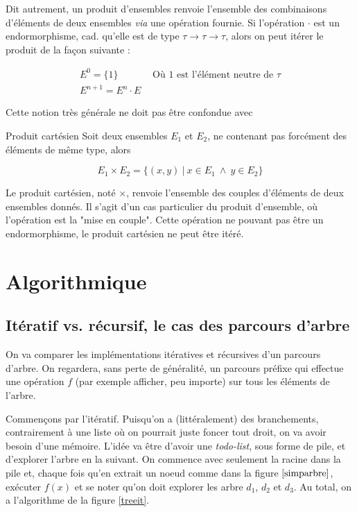 Dit autrement, un produit d'ensembles renvoie l'ensemble des combinaisons d'éléments de deux ensembles \textit{via} une opération fournie. Si l'opération $\cdot$ est un endormorphisme, cad. qu'elle est de type $\tau \rightarrow \tau \rightarrow \tau$, alors on peut itérer le produit de la façon suivante :

\begin{eqnarray*}
E^0 = \{1\} ~~~~~~~~~~~~~~~~ \textrm{Où $1$ est l'élément neutre de $\tau$} \\
E^{n+1} = E^n \cdot E
\end{eqnarray*}

Cette notion très générale ne doit pas être confondue avec

\begin{definition}{Produit cartésien}{}
Soit deux ensembles $E_1$ et $E_2$, ne contenant pas forcément des éléments de même type, alors

\[
E_1 \times E_2 = \{(x,y)~|~x \in E_1~\wedge~y \in E_2\}
\]
\end{definition}

Le produit cartésien, noté $\times$, renvoie l'ensemble des couples d'éléments de deux ensembles donnés. Il s'agit d'un cas particulier du produit d'ensemble, où l'opération est la "mise en couple". Cette opération ne pouvant pas être un endormorphisme, le produit cartésien ne peut être itéré.

\section{Algorithmique}

\subsection{Itératif vs. récursif, le cas des parcours d'arbre}
\label{itersif}
On va comparer les implémentations itératives et récursives d'un parcours d'arbre. On regardera, sans perte de généralité, un parcours préfixe qui effectue une opération $f$ (par exemple afficher, peu importe) sur tous les éléments de l'arbre.

Commençons par l'itératif. Puisqu'on a (littéralement) des branchements, contrairement à une liste où on pourrait juste foncer tout droit, on va avoir besoin d'une mémoire. L'idée va être d'avoir une \textit{todo-list}, sous forme de pile, et d'explorer l'arbre en la suivant. On commence avec seulement la racine dans la pile et, chaque fois qu'en extrait un noeud comme dans la figure $\ref{simparbre}$, exécuter $f(x)$ et se noter qu'on doit explorer les arbre $d_1$, $d_2$ et $d_3$. Au total, on a l'algorithme de la figure \ref{treeit}.

